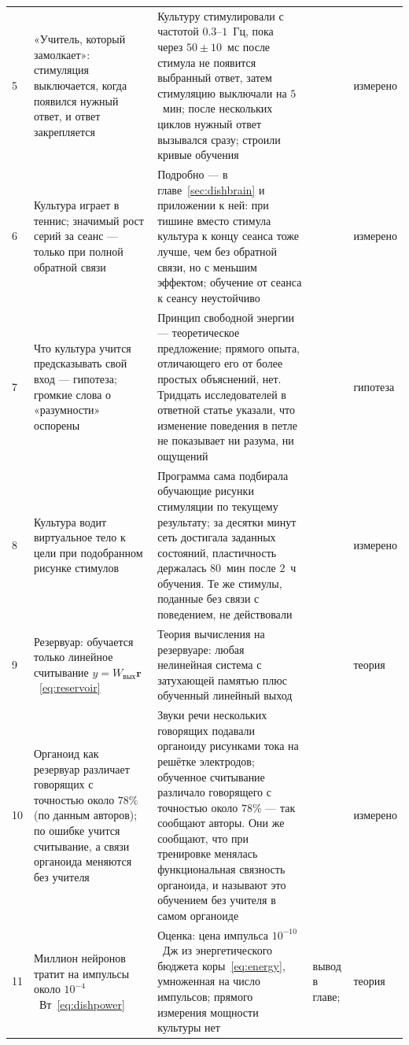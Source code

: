 {\begin{longtable}{>{\raggedright}p{0.5cm}>{\raggedright}p{4.0cm}>{\raggedright}p{5.6cm}>{\raggedright}p{2.3cm}>{\raggedright\arraybackslash}p{1.7cm}}
5 & «Учитель, который замолкает»: стимуляция выключается, когда появился нужный ответ, и ответ закрепляется & Культуру стимулировали с частотой $0.3$--$1$~Гц, пока через $50\pm10$~мс после стимула не появится выбранный ответ, затем стимуляцию выключали на $5$~мин; после нескольких циклов нужный ответ вызывался сразу; строили кривые обучения & \cite{Shahaf2001} & измерено \\
6 & Культура играет в теннис; значимый рост серий за сеанс --- только при полной обратной связи & Подробно --- в главе~\ref{sec:dishbrain} и приложении к ней: при тишине вместо стимула культура к концу сеанса тоже лучше, чем без обратной связи, но с меньшим эффектом; обучение от сеанса к сеансу неустойчиво & \cite{Kagan2022} & измерено \\
7 & Что культура учится предсказывать свой вход --- гипотеза; громкие слова о «разумности» оспорены & Принцип свободной энергии --- теоретическое предложение; прямого опыта, отличающего его от более простых объяснений, нет. Тридцать исследователей в ответной статье указали, что изменение поведения в петле не показывает ни разума, ни ощущений & \cite{Friston2010,Balci2023} & гипотеза \\
8 & Культура водит виртуальное тело к цели при подобранном рисунке стимулов & Программа сама подбирала обучающие рисунки стимуляции по текущему результату; за десятки минут сеть достигала заданных состояний, пластичность держалась $80$~мин после $2$~ч обучения. Те же стимулы, поданные без связи с поведением, не действовали & \cite{Bakkum2008} & измерено \\
9 & Резервуар: обучается только линейное считывание $y=W_{\text{вых}}\mathbf r$~\eqref{eq:reservoir} & Теория вычисления на резервуаре: любая нелинейная система с затухающей памятью плюс обученный линейный выход & \cite{Maass2002,JaegerHaas2004} & теория \\
10 & Органоид как резервуар различает говорящих с точностью около $78\%$ (по данным авторов); по ошибке учится считывание, а связи органоида меняются без учителя & Звуки речи нескольких говорящих подавали органоиду рисунками тока на решётке электродов; обученное считывание различало говорящего с точностью около $78\%$ --- так сообщают авторы. Они же сообщают, что при тренировке менялась функциональная связность органоида, и называют это обучением без учителя в самом органоиде & \cite{Cai2023} & измерено \\
11 & Миллион нейронов тратит на импульсы около $10^{-4}$~Вт~\eqref{eq:dishpower} & Оценка: цена импульса $10^{-10}$~Дж из энергетического бюджета коры~\eqref{eq:energy}, умноженная на число импульсов; прямого измерения мощности культуры нет & вывод в главе; \cite{Attwell2001} & теория \\

\end{longtable}}
